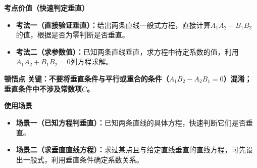 \begin{explanationbox}
	\medskip
	\textbf{\textcolor{CExplanation}{考点价值（快速判定垂直）}}
	\begin{itemize}[leftmargin=*, itemsep=0.5em, topsep=0.4em]
		\item \textbf{考法一（直接验证垂直）：}给出两条直线一般式方程，直接计算$A_1A_2+B_1B_2$的值，根据是否为零判断是否垂直。
		\item \textbf{考法二（求参数值）：}已知两条直线垂直，求方程中待定系数的值，利用$A_1A_2+B_1B_2=0$列方程求解。
	\end{itemize}

	\medskip
	\textbf{\textcolor{CExplanation}{顿悟点}}
	\textbf{关键：不要将垂直条件与平行或重合的条件（$A_1B_2-A_2B_1=0$）混淆；垂直条件中不涉及常数项$C$。}

	\medskip
	\textbf{\textcolor{CExplanation}{使用场景}}
	\begin{itemize}[leftmargin=*, itemsep=0.5em, topsep=0.4em]
		\item \textbf{场景一（已知方程判垂直）：}已知两条直线的具体方程，快速判断它们是否垂直。
		\item \textbf{场景二（求垂直直线方程）：}求过某点且与给定直线垂直的直线方程，可先设出一般式，利用垂直条件确定系数关系。
	\end{itemize}

\end{explanationbox}
